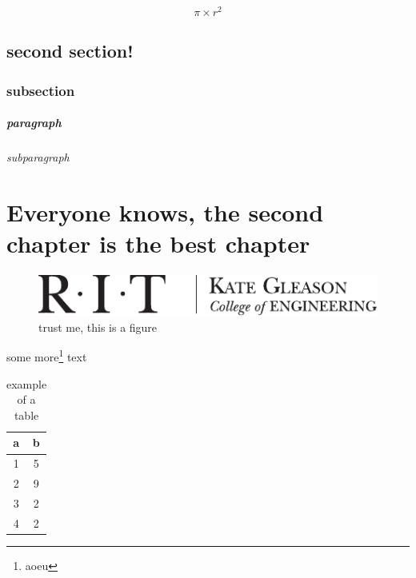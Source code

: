 \documentclass{ritthesis}
\begin{document}
\begin{equation}
\pi\times r^2
\label{equ:area}
\end{equation}

\section{second section!}

\subsection{subsection}

\paragraph{paragraph}

\subparagraph{subparagraph}

\lipsum{}
\chapter{Everyone knows, the second chapter is the best chapter}
\lipsum{}

\begin{figure}
\centering
\includegraphics{kgcoelogohoriz}
\caption{trust me, this is a figure}
\label{fig:samp}
\end{figure}

some more\footnote{aoeu} text

\begin{table}
\centering
\caption{example of a table}
\label{tab:samp}
\begin{tabular}{cc}
\hline
a		& b\\
\hline
1		& 5\\
2		& 9\\
3		& 2\\
4		& 2\\
\hline
\end{tabular}
\end{table}
\end{document}
